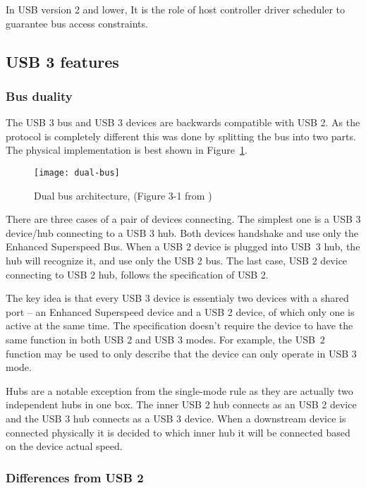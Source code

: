 In USB version 2 and lower, It is the role of host controller driver scheduler
to guarantee bus access constraints.

\subsection{USB 3 features}

\subsubsection{Bus duality}

The USB 3 bus and USB 3 devices are backwards compatible with USB 2. As the
protocol is completely different this was done by splitting the bus into two
parts. The physical implementation is best shown in Figure~\ref{fig:dual-bus}.

\begin{figure}[h]
	\centering
	\texttt{[image: dual-bus]}
	\caption{Dual bus architecture, (Figure 3-1 from \cite{usb3})}
	\label{fig:dual-bus}
\end{figure}

There are three cases of a pair of devices connecting. The simplest one is
a USB 3 device/hub connecting to a USB 3 hub. Both devices handshake and use
only the Enhanced Superspeed Bus. When a USB 2 device is plugged into USB~3
hub, the hub will recognize it, and use only the USB 2 bus. The last case, USB
2 device connecting to USB 2 hub, follows the specification of USB 2.

The key idea is that every USB 3 device is essentialy two devices with a shared
port -- an Enhanced Superspeed device and a USB 2 device, of which only one is
active at the same time. The specification doesn't require the device to have
the same function in both USB 2 and USB 3 modes. For example, the USB~2
function may be used to only describe that the device can only operate in USB 3 mode.

Hubs are a notable exception from the single-mode rule as they are actually
two independent hubs in one box. The inner USB 2 hub connects as an USB
2 device and the USB 3 hub connects as a USB 3 device. When a downstream
device is connected physically it is decided to which inner hub it will be
connected based on the device actual speed.

\subsubsection{Differences from USB 2}

